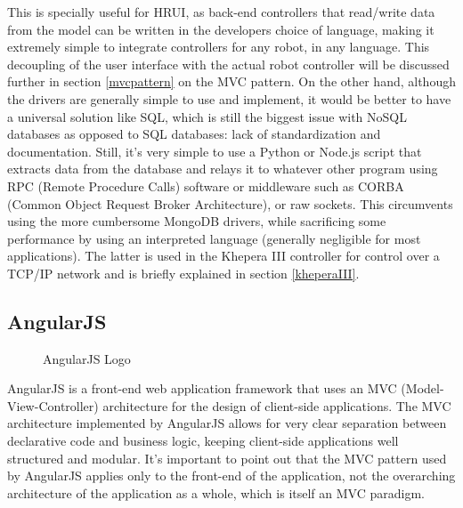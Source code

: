 This is specially useful for HRUI, as back-end controllers that read/write data from the model can be written in the developers choice
of language, making it extremely simple to integrate controllers for any robot, in any language. This decoupling of the user interface
with the actual robot controller will be discussed further in section \ref{mvcpattern} on the MVC pattern. On the other hand, although
the drivers are generally simple to use and implement, it would be better to have a universal solution like SQL, which is still the
biggest issue with NoSQL databases as opposed to SQL databases: lack of standardization and documentation. Still, it's very simple to
use a Python or Node.js script that extracts data from the database and relays it to whatever other program using RPC (Remote Procedure
Calls) software or middleware such as CORBA (Common Object Request Broker Architecture), or raw sockets. This circumvents using the more
cumbersome MongoDB drivers, while sacrificing some performance by using an interpreted language (generally negligible for most
applications). The latter is used in the Khepera III controller for control over a TCP/IP network and is briefly explained in section
\ref{kheperaIII}.
\newpage
\subsection{AngularJS} \label{AngularJS}
\begin{figure}[H]
\centering

\caption{AngularJS Logo}
\end{figure}
AngularJS is a front-end web application framework that uses an MVC (Model-View-Controller) architecture for the design of client-side
applications. The MVC architecture implemented by AngularJS allows for very clear separation between declarative code and business
logic, keeping client-side applications well structured and modular. It's important to point out that the MVC pattern used by AngularJS
applies only to the front-end of the application, not the overarching architecture of the application as a whole, which is itself an MVC
paradigm.\\

